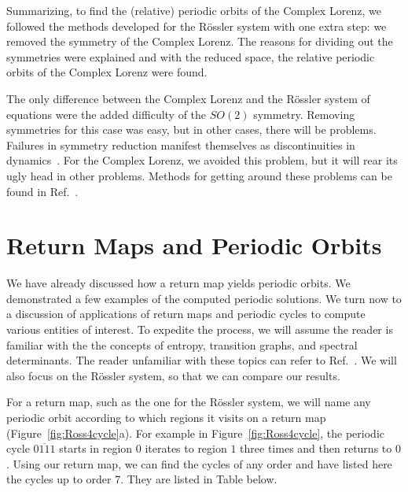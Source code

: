 \documentclass[12 pt]{article}
\begin{document}
Summarizing, to find the (relative) periodic orbits of the Complex
Lorenz, we followed the methods developed for the R\"ossler system with
one extra step: we removed the symmetry of the Complex Lorenz.  The
reasons for dividing out the symmetries were explained and with the
reduced space, the relative periodic orbits of the Complex Lorenz were
found.

The only difference between the Complex Lorenz and the R\"ossler system
of equations were the added difficulty of the $SO(2)$ symmetry.  Removing
symmetries for this case was easy, but in other cases, there will be
problems.  Failures in symmetry reduction manifest themselves as
discontinuities in dynamics~\cite{Atl}.  For the Complex Lorenz, we
avoided this problem, but it will rear its ugly head in other problems.
Methods for getting around these problems can be found in Ref.~\cite{Atl}.

\section{Return Maps and Periodic Orbits}
\label{sec:Retmaps}
We have already discussed how a return map yields periodic orbits.  We
demonstrated a few examples of the computed periodic solutions.  We turn
now to a discussion of applications of return maps and periodic cycles to
compute various entities of interest.  To expedite the process, we will
assume the reader is familiar with the the concepts of entropy,
transition graphs, and spectral determinants.  The reader unfamiliar with
these topics can refer to Ref.~\cite{CB}.  We will also focus on the R\"ossler
system, so that we can compare our results.

For a return map, such as the one for the R\"ossler system, we will name
any periodic orbit according to which regions it visits on a return map
(Figure~\ref{fig:Ross4cycle}a).  For example in
Figure~\ref{fig:Ross4cycle}, the periodic cycle $\overline{0111}$ starts
in region $0$ iterates to region $1$ three times and then returns to $0$.
Using our return map, we can find the cycles of any order and have listed
here the cycles up to order 7.  They are listed in Table below.
\end{document}

